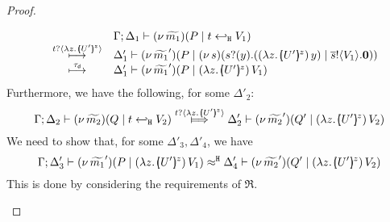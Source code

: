 \begin{proof}
\begin{enumerate}[$-$]
\begin{enumerate}[(a)]
\begin{enumerate}[i)]

							\[
							\begin{array}{rcl}
							& & \Gamma; \Delta_1 \proves \newsp{\widetilde{m_1}}{P \Par \htrigger{t}{V_1}  } \\
							&  \hby{\bactinp{t}{\abs{z}{\mapchar{U'}{z}}}} & 
							\Delta_1' \proves \newsp{\widetilde{m_1}'}{P \Par \newsp{s}{\binp{s}{y} {(\appl{(\abs{z}{\mapchar{U'}{z}})}{y}}) \Par \bout{\dual{s}}{V_1} \inact}}
							\\
							& \hby{\dtau} & \Delta_1' \proves \newsp{\widetilde{m_1}'}{P \Par \appl{(\abs{z}{\mapchar{U'}{z}})}{V_1}}
								\end{array}
							\]
							Furthermore, we have the following, for some $\Delta'_2$:
							\[
								\horel{\Gamma}{\Delta_2}{\newsp{\widetilde{m_2}}{Q \Par \htrigger{t}{V_2}  } }
								{\Hby{\bactinp{t}{\abs{z}{\mapchar{U'}{z}}}}}
								{\Delta_2'}{\newsp{\widetilde{m_2}'}{Q' \Par \appl{(\abs{z}{\mapchar{U'}{z}})}{V_2}}}
							\]
							We need to show that, for some $\Delta'_3, \Delta'_4$, we have
							\[
								\horel{\Gamma}{\Delta_3'}{\newsp{\widetilde{m_1}'}{P \Par \appl{(\abs{z}{\mapchar{U'}{z}})}{V_1}}}
								{\hwb}
								{\Delta_4'}{\newsp{\widetilde{m_2}'}{Q' \Par \appl{(\abs{z}{\mapchar{U'}{z}})}{V_2}}}
							\]
							This is done by considering the requirements of $\Re$.


\end{enumerate}
\end{enumerate}
\end{enumerate}
\end{proof}
